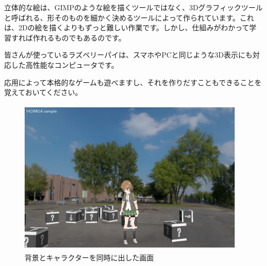 立体的な絵は、GIMPのような絵を描くツールではなく、3Dグラフィックツールと呼ばれる、形そのものを細かく決めるツールによって作られています。これは、2Dの絵を描くよりもずっと難しい作業です。しかし、仕組みがわかって学習すれば作れるものでもあるのです。


皆さんが使っているラズベリーパイは、スマホやPCと同じような3D表示にも対応した高性能なコンピュータです。

応用によって本格的なゲームも遊べますし、それを作りだすこともできることを覚えておいてください。


\begin{figure}[H]
    \begin{center}
      \includegraphics[keepaspectratio,width=10.834cm,height=7.514cm]{text04-img/s_pronamabox.png}
      \caption{背景とキャラクターを同時に出した画面}
    \end{center}
    \label{fig:prog_menu}
\end{figure}

